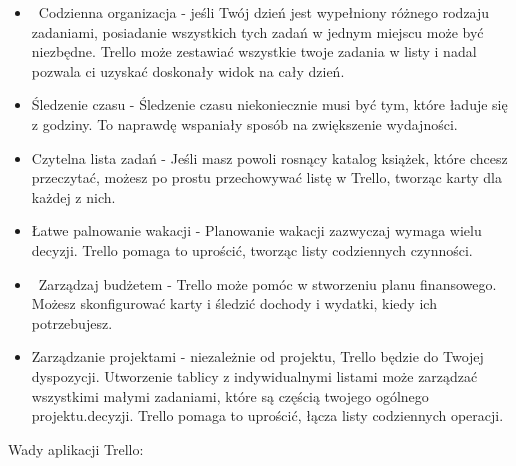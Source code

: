 \documentclass[12pt]{article}
\renewcommand{\_}{\kern-1.5pt\textunderscore\kern-1.5pt}
\begin{document}
\begin{itemize}
	\item  Codzienna organizacja - jeśli Twój dzień jest wypełniony różnego rodzaju zadaniami, posiadanie wszystkich tych zadań w jednym miejscu może być niezbędne. Trello może zestawiać wszystkie twoje zadania w listy i nadal pozwala ci uzyskać doskonały widok na cały dzień.\par

	\item Śledzenie czasu - Śledzenie czasu niekoniecznie musi być tym, które ładuje się z godziny. To naprawdę wspaniały sposób na zwiększenie wydajności.\par

	\item Czytelna lista zadań - Jeśli masz powoli rosnący katalog książek, które chcesz przeczytać, możesz po prostu przechowywać listę w Trello, tworząc karty dla każdej z nich.\par

	\item Łatwe palnowanie wakacji - Planowanie wakacji zazwyczaj wymaga wielu decyzji. Trello pomaga to uprościć, tworząc listy codziennych czynności.\par

	\item  Zarządzaj budżetem - Trello może pomóc w stworzeniu planu finansowego. Możesz skonfigurować karty i śledzić dochody i wydatki, kiedy ich potrzebujesz.\par

	\item Zarządzanie projektami - niezależnie od projektu, Trello będzie do Twojej dyspozycji. Utworzenie tablicy z indywidualnymi listami może zarządzać wszystkimi małymi zadaniami, które są częścią twojego ogólnego projektu.decyzji. Trello pomaga to uprościć, łącza listy codziennych operacji.
\end{itemize}\par


\vspace{\baselineskip}
\begin{adjustwidth}{1.25in}{0.0in}
Wady aplikacji Trello:\par

\end{adjustwidth}
\end{document}
